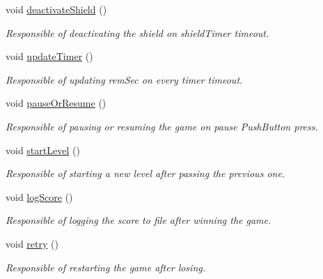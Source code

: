 \begin{DoxyCompactItemize}
\item 
\hypertarget{classGame2Scene_aa54fef8cfc785656172fce2d4c035eec}{void \hyperlink{classGame2Scene_aa54fef8cfc785656172fce2d4c035eec}{deactivate\-Shield} ()}\label{classGame2Scene_aa54fef8cfc785656172fce2d4c035eec}

\begin{DoxyCompactList}\small\item\em Responsible of deactivating the shield on shield\-Timer timeout. \end{DoxyCompactList}\item 
\hypertarget{classGame2Scene_ac54e5865a35d342190b668418029255c}{void \hyperlink{classGame2Scene_ac54e5865a35d342190b668418029255c}{update\-Timer} ()}\label{classGame2Scene_ac54e5865a35d342190b668418029255c}

\begin{DoxyCompactList}\small\item\em Responsible of updating rem\-Sec on every timer timeout. \end{DoxyCompactList}\item 
\hypertarget{classGame2Scene_a0fce06771965e064807b71734effb3aa}{void \hyperlink{classGame2Scene_a0fce06771965e064807b71734effb3aa}{pause\-Or\-Resume} ()}\label{classGame2Scene_a0fce06771965e064807b71734effb3aa}

\begin{DoxyCompactList}\small\item\em Responsible of pausing or resuming the game on pause Push\-Button press. \end{DoxyCompactList}\item 
\hypertarget{classGame2Scene_ab26c015154dc7eaf33c3b1f009953492}{void \hyperlink{classGame2Scene_ab26c015154dc7eaf33c3b1f009953492}{start\-Level} ()}\label{classGame2Scene_ab26c015154dc7eaf33c3b1f009953492}

\begin{DoxyCompactList}\small\item\em Responsible of starting a new level after passing the previous one. \end{DoxyCompactList}\item 
\hypertarget{classGame2Scene_a70d447e24186449ec0a9fd67a42d0d1f}{void \hyperlink{classGame2Scene_a70d447e24186449ec0a9fd67a42d0d1f}{log\-Score} ()}\label{classGame2Scene_a70d447e24186449ec0a9fd67a42d0d1f}

\begin{DoxyCompactList}\small\item\em Responsible of logging the score to file after winning the game. \end{DoxyCompactList}\item 
\hypertarget{classGame2Scene_a7a63663bf7d3a79895bb56fe7240a9b2}{void \hyperlink{classGame2Scene_a7a63663bf7d3a79895bb56fe7240a9b2}{retry} ()}\label{classGame2Scene_a7a63663bf7d3a79895bb56fe7240a9b2}

\begin{DoxyCompactList}\small\item\em Responsible of restarting the game after losing. \end{DoxyCompactList}\end{DoxyCompactItemize}
